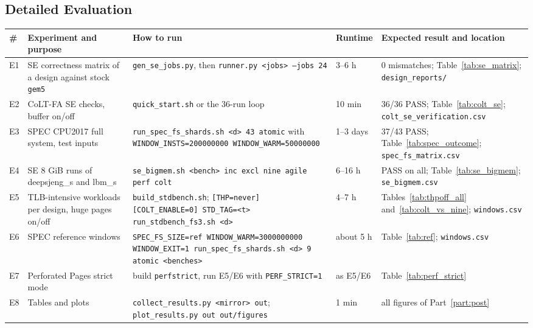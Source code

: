 \subsection{Detailed Evaluation}
\begin{table}[H]
\centering
\small
\begin{tabularx}{\textwidth}{l X X l X}
\toprule
\textbf{\#} & \textbf{Experiment and purpose} & \textbf{How to run} & \textbf{Runtime} & \textbf{Expected result and location} \\
\midrule
E1 & SE correctness matrix of a design against stock \texttt{gem5} & \texttt{gen\_se\_jobs.py}, then \texttt{runner.py <jobs> --jobs 24} & 3--6 h & 0 mismatches; Table~\ref{tab:se_matrix}; \texttt{design\_reports/} \\
E2 & CoLT-FA SE checks, buffer on/off & \texttt{quick\_start.sh} or the 36-run loop & 10 min & 36/36 PASS; Table~\ref{tab:colt_se}; \texttt{colt\_se\_verification.csv} \\
E3 & SPEC CPU2017 full system, test inputs & \texttt{run\_spec\_fs\_shards.sh <d> 43 atomic} with \texttt{WINDOW\_INSTS=200000000 WINDOW\_WARM=50000000} & 1--3 days & 37/43 PASS; Table~\ref{tab:spec_outcome}; \texttt{spec\_fs\_matrix.csv} \\
E4 & SE 8 GiB runs of deepsjeng\_s and lbm\_s & \texttt{se\_bigmem.sh <bench> inc excl nine agile perf colt} & 6--16 h & PASS on all; Table~\ref{tab:se_bigmem}; \texttt{se\_bigmem.csv} \\
E5 & TLB-intensive workloads per design, huge pages on/off & \texttt{build\_stdbench.sh}; \texttt{[THP=never] [COLT\_ENABLE=0] STD\_TAG=<t> run\_stdbench\_fs3.sh <d>} & 4--7 h & Tables~\ref{tab:thpoff_all} and~\ref{tab:colt_vs_nine}; \texttt{windows.csv} \\
E6 & SPEC reference windows & \texttt{SPEC\_FS\_SIZE=ref WINDOW\_WARM=3000000000 WINDOW\_EXIT=1 run\_spec\_fs\_shards.sh <d> 9 atomic <benches>} & about 5 h & Table~\ref{tab:ref}; \texttt{windows.csv} \\
E7 & Perforated Pages strict mode & build \texttt{perfstrict}, run E5/E6 with \texttt{PERF\_STRICT=1} & as E5/E6 & Table~\ref{tab:perf_strict} \\
E8 & Tables and plots & \texttt{collect\_results.py <mirror> out}; \texttt{plot\_results.py out out/figures} & 1 min & all figures of Part~\ref{part:post} \\
\bottomrule
\end{tabularx}
\end{table}
